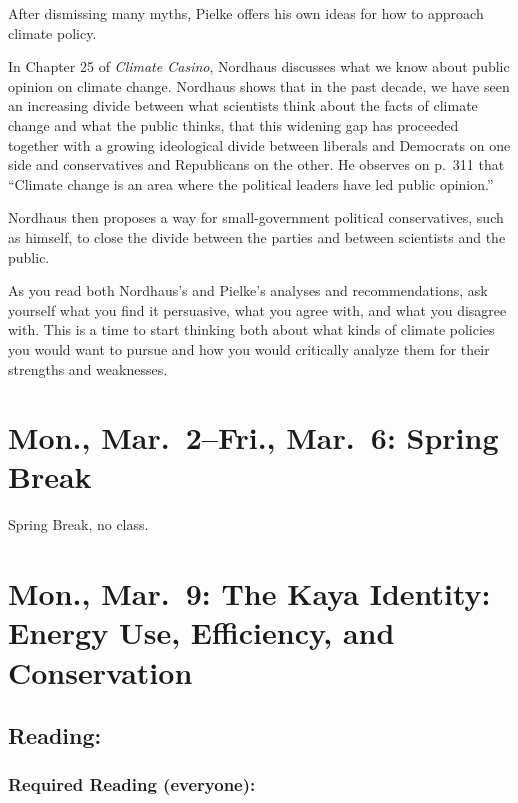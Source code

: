 \documentclass[
]{article}
\begin{document}
After dismissing many myths, Pielke offers his own ideas for how to
approach climate policy.

In Chapter 25 of \emph{Climate Casino}, Nordhaus discusses what we know
about public opinion on climate change. Nordhaus shows that in the past
decade, we have seen an increasing divide between what scientists think
about the facts of climate change and what the public thinks, that this
widening gap has proceeded together with a growing ideological divide
between liberals and Democrats on one side and conservatives and
Republicans on the other. He observes on p.~311 that ``Climate change is
an area where the political leaders have led public opinion.''

Nordhaus then proposes a way for small-government political
conservatives, such as himself, to close the divide between the parties
and between scientists and the public.

As you read both Nordhaus's and Pielke's analyses and recommendations,
ask yourself what you find it persuasive, what you agree with, and what
you disagree with. This is a time to start thinking both about what
kinds of climate policies you would want to pursue and how you would
critically analyze them for their strengths and weaknesses.

\hypertarget{mon.-mar.-2fri.-mar.-6-spring-break}{%
\section{Mon., Mar.~2--Fri., Mar.~6: Spring
Break}\label{mon.-mar.-2fri.-mar.-6-spring-break}}

Spring Break, no class.

\hypertarget{mon.-mar.-9-the-kaya-identity-energy-use-efficiency-and-conservation}{%
\section{Mon., Mar.~9: The Kaya Identity: Energy Use, Efficiency, and
Conservation}\label{mon.-mar.-9-the-kaya-identity-energy-use-efficiency-and-conservation}}

\hypertarget{reading-23}{%
\subsection{Reading:}\label{reading-23}}

\hypertarget{required-reading-everyone-18}{%
\subsubsection{Required Reading
(everyone):}\label{required-reading-everyone-18}}
\end{document}
